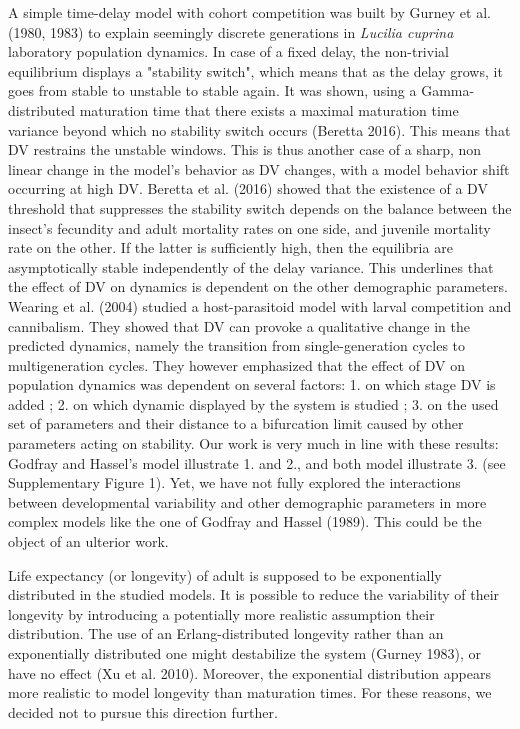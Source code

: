 \documentclass[12pt,a4paper,onecolumn]{article}
\begin{document}
\tabto{1.5 cm}A simple time-delay model with cohort competition was built by Gurney et al. (1980, 1983) to explain seemingly discrete generations in \textit{Lucilia cuprina} laboratory population dynamics. In case of a fixed delay, the non-trivial equilibrium displays a "stability switch", which means that as the delay grows, it goes from stable to unstable to stable again. It was shown, using a Gamma-distributed maturation time that there exists a maximal maturation time variance beyond which no stability switch occurs (Beretta 2016). This means that DV restrains the unstable windows. This is thus another case of a sharp, non linear change in the model's behavior as DV changes, with a model behavior shift occurring at high DV.  Beretta et al. (2016) showed that the existence of a DV threshold that suppresses the stability switch depends on the balance between the insect's fecundity and adult mortality rates on one side, and juvenile mortality rate on the other. If the latter is sufficiently high, then the equilibria are asymptotically stable independently of the delay variance. This underlines that the effect of DV on dynamics is dependent on the other demographic parameters. Wearing et al. (2004) studied a host-parasitoid model with larval competition and cannibalism. They showed that DV can provoke a qualitative change in the predicted dynamics, namely the transition from single-generation cycles to multigeneration cycles. They however emphasized that the effect of DV on population dynamics was dependent on several factors: 1. on which stage DV is added ; 2. on which dynamic displayed by the system is studied ; 3. on the used set of parameters and their distance to a bifurcation limit caused by other parameters acting on stability. Our work is very much in line with these results: Godfray and Hassel's model illustrate 1. and 2., and both model illustrate 3. (see Supplementary Figure 1). Yet, we have not fully explored the interactions between developmental variability and other demographic parameters in more complex models like the one of Godfray and Hassel (1989). This could be the object of an ulterior work.

\tabto{1.5 cm} Life expectancy (or longevity) of adult is supposed to be exponentially distributed in the studied models. It is possible to reduce the variability of their longevity by introducing a potentially more realistic assumption their distribution. The use of an Erlang-distributed longevity rather than an exponentially distributed one might destabilize the system (Gurney 1983), or have no effect (Xu et al. 2010). Moreover, the exponential distribution appears more realistic to model longevity than maturation times. For these reasons, we decided not to pursue this direction further.
\end{document}

